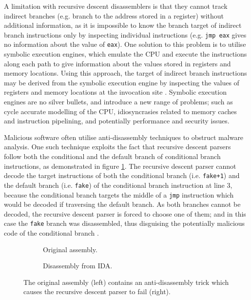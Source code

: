 A limitation with recursive descent disassemblers is that they cannot track indirect branches (e.g. branch to the address stored in a register) without additional information, as it is impossible to know the branch target of indirect branch instructions only by inspecting individual instructions (e.g. \texttt{jmp eax} gives no information about the value of \texttt{eax}). One solution to this problem is to utilise symbolic execution engines, which emulate the CPU and execute the instructions along each path to give information about the values stored in registers and memory locations. Using this approach, the target of indirect branch instructions may be derived from the symbolic execution engine by inspecting the values of registers and memory locations at the invocation site \cite{mcsema}. Symbolic execution engines are no silver bullets, and introduce a new range of problems; such as cycle accurate modelling of the CPU, idiosyncrasies related to memory caches and instruction pipelining, and potentially performance and security issues.

Malicious software often utilise anti-disassembly techniques to obstruct malware analysis. One such technique exploits the fact that recursive descent parsers follow both the conditional and the default branch of conditional branch instructions, as demonstrated in figure \ref{fig:anti-disassembly}. The recursive descent parser cannot decode the target instructions of both the conditional branch (i.e. \texttt{fake+1}) and the default branch (i.e. \texttt{fake}) of the conditional branch instruction at line 3, because the conditional branch targets the middle of a \texttt{jmp} instruction which would be decoded if traversing the default branch. As both branches cannot be decoded, the recursive descent parser is forced to choose one of them; and in this case the \texttt{fake} branch was disassembled, thus disguising the potentially malicious code of the conditional branch \cite{anti_disassembly}.

\begin{figure}[htbp]
	\centering
	\begin{subfigure}[t]{0.59\textwidth}
		
		\caption{Original assembly.}
	\end{subfigure}
	\qquad
	\begin{subfigure}[t]{0.34\textwidth}
		
		\caption{Disassembly from IDA.}
	\end{subfigure}
	\caption{The original assembly (left) contains an anti-disassembly trick which causes the recursive descent parser to fail (right).}
	\label{fig:anti-disassembly}
\end{figure}

